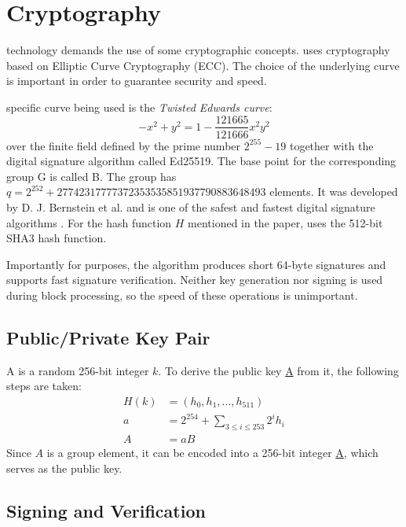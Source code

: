 \section{Cryptography}
\label{sec:cryptography}


 technology demands the use of some cryptographic concepts.
\codenamespace uses cryptography based on Elliptic Curve Cryptography (ECC).
The choice of the underlying curve is important in order to guarantee security and speed.

\The specific curve being used is the \emph{Twisted Edwards curve}:
$$ -x^2 + y^2 = 1 - \frac{121665}{121666} x^2 y^2$$
over the finite field defined by the prime number $2^{255}-19$ together with the digital signature algorithm called Ed25519.
The base point for the corresponding group G is called B. The group has $q=2^{252} + 27742317777372353535851937790883648493$ elements.
It was developed by D. J. Bernstein et al. and is one of the safest and fastest digital signature algorithms \cite{Bernstein2011}.
For the hash function $H$ mentioned in the paper, \codenamespace uses the 512-bit SHA3 hash function.

Importantly for \codenamespace purposes, the algorithm produces short 64-byte signatures and supports fast signature verification.
Neither key generation nor signing is used during block processing, so the speed of these operations is unimportant.

\subsection{Public/Private Key Pair}

A  is a random 256-bit integer $k$. To derive the public key \underline{A} from it, the following steps are taken:
\begin{align}
H(k) &=(h_0, h_1,..., h_{511}) \\
a &= 2^{254} + \sum_{3\leq i \leq 253} 2^i h_i \\
A &= aB
\end{align}
Since $A$ is a group element, it can be encoded into a 256-bit integer \underline{A}, which serves as the public key.

\subsection{Signing and Verification}


